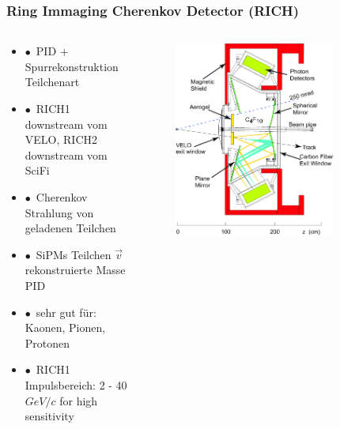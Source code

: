\documentclass[aspectratio=1610, 12pt, xcolor=dvipsnames]{beamer}
\begin{document}
\begin{frame}\frametitle{Ring Immaging Cherenkov Detector (RICH)}
  \begin{columns}
    \begin{column}[c]{0.48\textwidth}
      \begin{itemize}
        \item $\bullet$\, PID + Spurrekonstruktion \to Teilchenart
        \item $\bullet$\, RICH1 downstream vom VELO, RICH2 downstream vom SciFi
        \item $\bullet$\, Cherenkov Strahlung von geladenen Teilchen
        \item $\bullet$\, SiPMs \to Teilchen $\vec{v}$ \to rekonstruierte Masse \to PID
        \item $\bullet$\, sehr gut für: Kaonen, Pionen, Protonen
        \item $\bullet$\, RICH1 Impulsbereich: 2 - 40 $GeV/c$ for high sensitivity
      \end{itemize}
    \end{column}
    \begin{column}[c]{0.48\textwidth}
      \begin{figure}
	       \centering
	       \includegraphics[width=0.8\textwidth]{plots/rich1.png}
      \end{figure}
    \end{column}
  \end{columns}
\end{frame}
\end{document}
